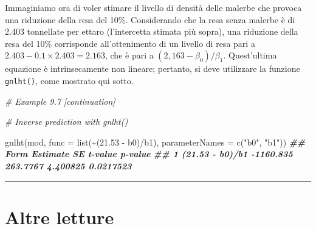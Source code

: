 \documentclass[
  12pt,
]{book}
\newenvironment{Shaded}{\begin{snugshade}}{\end{snugshade}}
\newcommand{\AttributeTok}[1]{\textcolor[rgb]{0.77,0.63,0.00}{#1}}
\newcommand{\CommentTok}[1]{\textcolor[rgb]{0.56,0.35,0.01}{\textit{#1}}}
\newcommand{\DocumentationTok}[1]{\textcolor[rgb]{0.56,0.35,0.01}{\textbf{\textit{#1}}}}
\newcommand{\FloatTok}[1]{\textcolor[rgb]{0.00,0.00,0.81}{#1}}
\newcommand{\FunctionTok}[1]{\textcolor[rgb]{0.00,0.00,0.00}{#1}}
\newcommand{\NormalTok}[1]{#1}
\newcommand{\SpecialCharTok}[1]{\textcolor[rgb]{0.00,0.00,0.00}{#1}}
\newcommand{\StringTok}[1]{\textcolor[rgb]{0.31,0.60,0.02}{#1}}
\begin{document}
Immaginiamo ora di voler stimare il livello di densità delle malerbe che provoca una riduzione della resa del 10\%. Considerando che la resa senza malerbe è di 2.403 tonnellate per ettaro (l'intercetta stimata più sopra), una riduzione della resa del 10\% corrisponde all'ottenimento di un livello di resa pari a \(2.403 - 0.1 \times 2.403 = 2.163\), che è pari a \((2,163 - \beta_0)/\beta_1\). Quest'ultima equazione è intrinsecamente non lineare; pertanto, si deve utilizzare la funzione \texttt{gnlht()}, come mostrato qui sotto.

\begin{Shaded}
\begin{Highlighting}[]
\CommentTok{\# Example 9.7 [continuation]}

\CommentTok{\# Inverse prediction with gnlht()}

\FunctionTok{gnlht}\NormalTok{(mod, }\AttributeTok{func =} \FunctionTok{list}\NormalTok{(}\SpecialCharTok{\textasciitilde{}}\NormalTok{(}\FloatTok{21.53} \SpecialCharTok{{-}}\NormalTok{ b0)}\SpecialCharTok{/}\NormalTok{b1), }
      \AttributeTok{parameterNames =} \FunctionTok{c}\NormalTok{(}\StringTok{"b0"}\NormalTok{, }\StringTok{"b1"}\NormalTok{))}
\DocumentationTok{\#\#              Form  Estimate       SE  t{-}value   p{-}value}
\DocumentationTok{\#\# 1 (21.53 {-} b0)/b1 {-}1160.835 263.7767 4.400825 0.0217523}
\end{Highlighting}
\end{Shaded}

\begin{center}\rule{0.5\linewidth}{0.5pt}\end{center}

\hypertarget{altre-letture-8}{%
\section{Altre letture}\label{altre-letture-8}}
\end{document}
